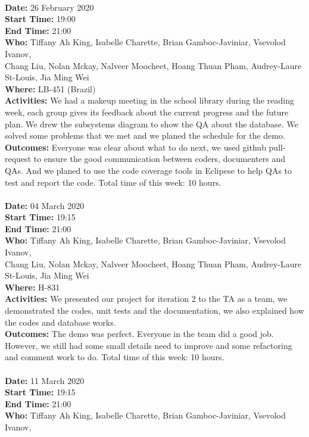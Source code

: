 \documentclass[12pt]{article}
\begin{document}
\\
{\bf Date:} 26 February 2020\\
{\bf Start Time:} 19:00\\
{\bf End Time:} 21:00\\
{\bf Who:} Tiffany Ah King, Isabelle Charette, Brian Gamboc-Javiniar, Vsevolod Ivanov,\\
Chang Liu, Nolan Mckay, Nalveer Moocheet, Hoang Thuan Pham, Audrey-Laure St-Louis, Jia Ming Wei\\
{\bf Where:} LB-451 (Brazil)\\
{\bf Activities:} We had a makeup meeting in the school library during the reading week, each group gives its feedback about the current progress and the future plan. We drew the subsystems diagram to show the QA about the database. We solved some problems that we met and we planed the schedule for the demo.\\
{\bf Outcomes:} Everyone was clear about what to do next, we used github pull-request to ensure the good communication between coders, documenters and QAs. And we planed to use the code coverage tools in Eclipese to help QAs to test and report the code. Total time of this week: 10 hours.\\
\\
{\bf Date:} 04 March 2020\\
{\bf Start Time:} 19:15\\
{\bf End Time:} 21:00\\
{\bf Who:} Tiffany Ah King, Isabelle Charette, Brian Gamboc-Javiniar, Vsevolod Ivanov,\\
Chang Liu, Nolan Mckay, Nalveer Moocheet, Hoang Thuan Pham, Audrey-Laure St-Louis, Jia Ming Wei\\
{\bf Where:} H-831\\
{\bf Activities:} We presented our project for iteration 2 to the TA as a team, we demonstrated the codes, unit tests and the documentation, we also explained how the codes and database works.\\
{\bf Outcomes:} The demo was perfect. Everyone in the team did a good job. However, we still had some small details need to improve and some refactoring and comment work to do. Total time of this week: 10 hours.\\
\\
{\bf Date:} 11 March 2020\\
{\bf Start Time:} 19:15 \\
{\bf End Time:} 21:00\\
{\bf Who:} Tiffany Ah King, Isabelle Charette, Brian Gamboc-Javiniar, Vsevolod Ivanov,\\
\end{document}
